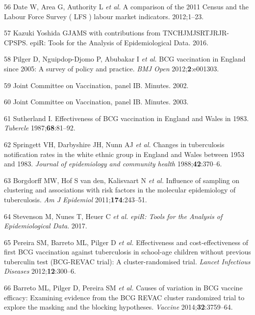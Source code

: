\documentclass[11pt,twoside]{bristolthesis}
\begin{document}
  \leavevmode\hypertarget{ref-Date2012}{}%
  56 Date W, Area G, Authority L \emph{et al.} A comparison of the 2011 Census and the Labour Force Survey ( LFS ) labour market indicators. 2012;1--23.
  
  \leavevmode\hypertarget{ref-Stevenson2016}{}%
  57 Kazuki Yoshida GJAMS with contributions from TNCHJMJSRTJRJR-CPSPS. epiR: Tools for the Analysis of Epidemiological Data. 2016.
  
  \leavevmode\hypertarget{ref-Pilger2012b}{}%
  58 Pilger D, Nguipdop-Djomo P, Abubakar I \emph{et al.} BCG vaccination in England since 2005: A survey of policy and practice. \emph{BMJ Open} 2012;\textbf{2}:e001303.
  
  \leavevmode\hypertarget{ref-JVCIBCG2002}{}%
  59 Joint Committee on Vaccination, panel IB. Minutes. 2002.
  
  \leavevmode\hypertarget{ref-JVCIBCG2003}{}%
  60 Joint Committee on Vaccination, panel IB. Minutes. 2003.
  
  \leavevmode\hypertarget{ref-Sutherland1987a}{}%
  61 Sutherland I. Effectiveness of BCG vaccination in England and Wales in 1983. \emph{Tubercle} 1987;\textbf{68}:81--92.
  
  \leavevmode\hypertarget{ref-Springett1988}{}%
  62 Springett VH, Darbyshire JH, Nunn AJ \emph{et al.} Changes in tuberculosis notification rates in the white ethnic group in England and Wales between 1953 and 1983. \emph{Journal of epidemiology and community health} 1988;\textbf{42}:370--6.
  
  \leavevmode\hypertarget{ref-Borgdorff2011}{}%
  63 Borgdorff MW, Hof S van den, Kalisvaart N \emph{et al.} Influence of sampling on clustering and associations with risk factors in the molecular epidemiology of tuberculosis. \emph{Am J Epidemiol} 2011;\textbf{174}:243--51.
  
  \leavevmode\hypertarget{ref-EpiR}{}%
  64 Stevenson M, Nunes T, Heuer C \emph{et al.} \emph{epiR: Tools for the Analysis of Epidemiological Data}. 2017.
  
  \leavevmode\hypertarget{ref-Pereira2012}{}%
  65 Pereira SM, Barreto ML, Pilger D \emph{et al.} Effectiveness and cost-effectiveness of first BCG vaccination against tuberculosis in school-age children without previous tuberculin test (BCG-REVAC trial): A cluster-randomised trial. \emph{Lancet Infectious Diseases} 2012;\textbf{12}:300--6.
  
  \leavevmode\hypertarget{ref-Barreto2014a}{}%
  66 Barreto ML, Pilger D, Pereira SM \emph{et al.} Causes of variation in BCG vaccine efficacy: Examining evidence from the BCG REVAC cluster randomized trial to explore the masking and the blocking hypotheses. \emph{Vaccine} 2014;\textbf{32}:3759--64.
  
\end{document}

